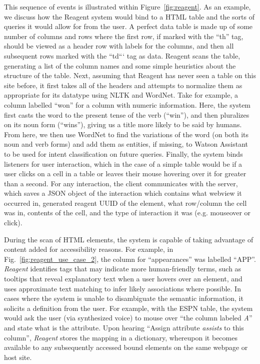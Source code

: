 This sequence of events is illustrated within Figure~\ref{fig:reagent}. As an example, we discuss how the
Reagent system would bind to a HTML table and the sorts of queries it would allow for from the user. A perfect data table
is made up of some number of columns and rows where the first row, if marked with the ``th'' tag, should be viewed
as a header row with labels for the columns, and then all subsequent rows marked with the ``td``` tag as data. Reagent
scans the table, generating a list of the column names and some simple heuristics about the structure of the table. Next,
assuming that Reagent has never seen a table on this site before, it first takes all of the headers and attempts to
normalize them as appropriate for its datatype using NLTK and WordNet. Take for example, a column labelled ``won''
for a column with numeric information. Here, the system first casts the word to the present tense of the verb (``win''),
and then pluralizes on its noun form (``wins''), giving us a title more likely to be said by humans. From here, we then
use WordNet to find the variations of the word (on both its noun and verb forms) and add them as entities, if missing,
to Watson Assistant to be used for intent classification on future queries.
Finally, the system binds listeners for user interaction, which in the case of a simple table would be if a user clicks on
a cell in a table or leaves their mouse hovering over it for greater than a second. For any interaction, the client
communicates with the server, which saves a JSON object of the interaction which contains what webview it occurred in,
generated reagent UUID of the element, what row/column the cell was in, contents of the cell, and the type of interaction
it was (e.g. mouseover or click).

During the scan of HTML elements, the system is capable of taking advantage of
content added for accessibility reasons. For example, in
Fig.~\ref{fig:reagent_use_case_2}, the column for ``appearances'' was labelled ``APP''.
\textit{Reagent} identifies tags that may indicate more human-friendly terms,
such as tooltips that reveal explanatory text when a user hovers over an
element, and uses approximate text matching to infer likely associations where
possible.
In cases where the system is unable to disambiguate the semantic information, it
solicits a definition from the user. For example, with the ESPN table, the
system would ask the user (via synthesized voice) to mouse over ``the column
labeled  \textit{A}'' and state what is the attribute. Upon hearing ``Assign
attribute \textit{assists} to this column'', \textit{Reagent} stores the
mapping in a dictionary, whereupon it becomes available to any subsequently
accessed bound elements on the same webpage or host site.

